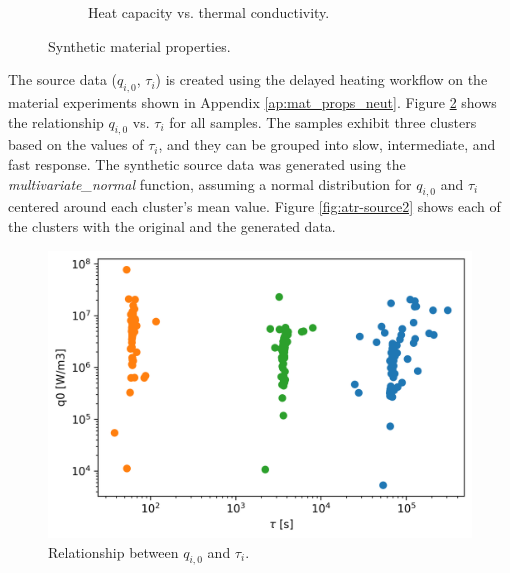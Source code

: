 \begin{figure}[htbp!]
\begin{subfigure}[b]{0.49\textwidth}
    \caption{Heat capacity vs. thermal conductivity.}
  \end{subfigure}
  \caption{Synthetic material properties.}
  \label{fig:atr-syn-mats-1}
\end{figure}

The source data ($q_{i,0}$, $\tau_i$) is created using the delayed heating workflow on the material experiments shown in Appendix \ref{ap:mat_props_neut}.
Figure \ref{fig:atr-source1} shows the relationship $q_{i,0}$ vs. $\tau_i$ for all samples.
The samples exhibit three clusters based on the values of $\tau_i$, and they can be grouped into slow, intermediate, and fast response.
The synthetic source data was generated using the \textit{multivariate\_normal} function, assuming a normal distribution for $q_{i,0}$ and $\tau_i$ centered around each cluster's mean value.
Figure \ref{fig:atr-source2} shows each of the clusters with the original and the generated data.

\begin{figure}[htbp!] %
  \centering
  \includegraphics[width=0.45\linewidth]{figures/q0_vs_tau}
  \hfill
  \caption{Relationship between $q_{i,0}$ and $\tau_i$.}
  \label{fig:atr-source1}
\end{figure}

